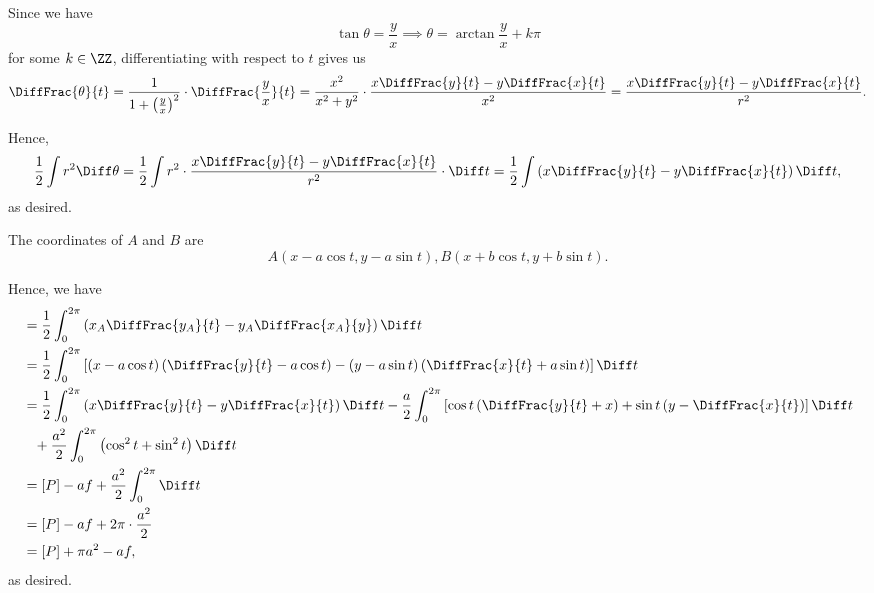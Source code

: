 \Question{\currfilebase}

Since we have
\[
    \tan \theta = \frac{y}{x} \implies \theta = \arctan \frac{y}{x} + k\pi
\]
for some \(k \in \ZZ\), differentiating with respect to \(t\) gives us
\[
    \DiffFrac{\theta}{t} = \frac{1}{1 + \left(\frac{y}{x}\right)^2} \cdot \DiffFrac{\frac{y}{x}}{t} = \frac{x^2}{x^2 + y^2} \cdot \frac{x\DiffFrac{y}{t} - y\DiffFrac{x}{t}}{x^2} = \frac{x\DiffFrac{y}{t} - y\DiffFrac{x}{t}}{r^2}.
\]

Hence,
\[
    \frac{1}{2} \int r^2 \Diff \theta = \frac{1}{2} \int r^2 \cdot \frac{x\DiffFrac{y}{t} - y\DiffFrac{x}{t}}{r^2} \cdot \Diff t = \frac{1}{2} \int \left(x\DiffFrac{y}{t} - y\DiffFrac{x}{t}\right) \Diff t,
\]
as desired.

The coordinates of \(A\) and \(B\) are
\[
    A \left(x - a \cos t, y - a \sin t\right), B \left(x + b \cos t, y + b \sin t\right).
\]

Hence, we have
\begin{align*}
    [A] & = \frac{1}{2} \int_{0}^{2\pi} \left(x_A \DiffFrac{y_A}{t} - y_A \DiffFrac{x_A}{y}\right) \Diff t                                                                                                                            \\
        & = \frac{1}{2} \int_{0}^{2\pi} \left[(x - a \cos t) \left(\DiffFrac{y}{t} - a \cos t\right) - (y - a \sin t) \left(\DiffFrac{x}{t} + a \sin t\right)\right] \Diff t                                                          \\
        & = \frac{1}{2} \int_{0}^{2\pi} \left(x\DiffFrac{y}{t} - y\DiffFrac{x}{t}\right) \Diff t - \frac{a}{2} \int_{0}^{2\pi} \left[\cos t \left(\DiffFrac{y}{t} + x\right) + \sin t \left(y - \DiffFrac{x}{t}\right)\right] \Diff t \\
        & \phantom{=} + \frac{a^2}{2} \int_{0}^{2\pi} \left(\cos^2 t + \sin^2 t\right) \Diff t                                                                                                                                        \\
        & = [P] - af + \frac{a^2}{2} \int_{0}^{2\pi} \Diff t                                                                                                                                                                          \\
        & = [P] - af + 2\pi \cdot \frac{a^2}{2}                                                                                                                                                                                       \\
        & = [P] + \pi a^2 - af,
\end{align*}
as desired.

